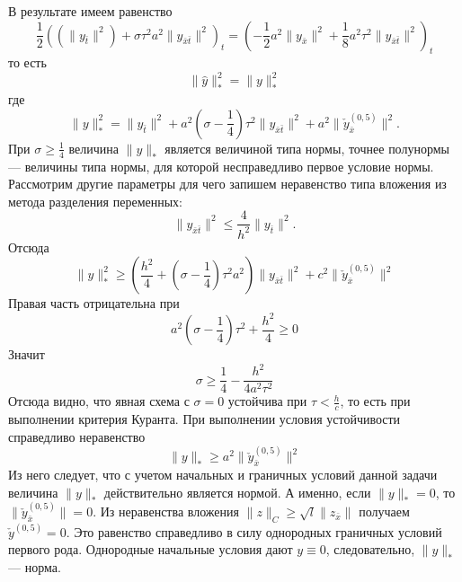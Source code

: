 \documentclass[12pt, a4paper]{article}
\newcommand{\widecheck}[1]{\check{#1}}
\newcommand{\down}[1]{\widecheck{#1}}
\begin{document}
	В результате имеем равенство
	\begin{equation*}
		\frac{1}{2}((\parallel y_{\bar{t}} \parallel^2) + \sigma \tau^2 a^2 \parallel y_{\bar{x}\bar{t}} \parallel^2)_t = (-\frac{1}{2} a^2 \parallel y_{\bar{x}} \parallel^2 + \frac{1}{8} a^2 \tau^2 \parallel y_{\bar{x}\bar{t}} \parallel^2)_t 
	\end{equation*}
	то есть
	\begin{equation*}
		\parallel \hat{y} \parallel^2_* = 	\parallel y \parallel^2_*
	\end{equation*}
	где 
	\begin{equation*}
		\parallel y \parallel^2_* = \parallel y_{\bar{t}} \parallel^2 + a^2(\sigma - \frac{1}{4}) \tau^2  \parallel y_{\bar{x}\bar{t}} \parallel^2 + a^2 \parallel \down{y}^{(0,5)}_{\bar{x}}\parallel^2.
	\end{equation*}
	При $\sigma\ge \frac{1}{4}$ величина $\parallel y \parallel_*$ является величиной типа нормы, точнее полунормы --- величины типа нормы, для которой несправедливо первое условие нормы. Рассмотрим другие параметры для чего запишем неравенство типа вложения из метода разделения переменных:
	\begin{equation*}
		\parallel y_{\bar{x}\bar{t}} \parallel^2 \le \frac{4}{h^2} \parallel y_{\bar{t}} \parallel^2.
	\end{equation*}
	Отсюда
	\begin{equation*}
		\parallel y \parallel^2_* \ge (\frac{h^2}{4} + (\sigma - \frac{1}{4}) \tau^2 a^2) \parallel y_{\bar{x}\bar{t}} \parallel^2 + c^2 \parallel \down{y}^{(0,5)}_{\bar{x}}\parallel^2
	\end{equation*}
	Правая часть отрицательна при
	\begin{equation*}
		a^2(\sigma - \frac{1}{4}) \tau^2 + \frac{h^2}{4} \ge 0
	\end{equation*}
	Значит
	\begin{equation*}
		\sigma \ge \frac{1}{4} - \frac{h^2}{4a^2 \tau^2}
	\end{equation*}
	Отсюда видно, что явная схема с $\sigma = 0$ устойчива при $\tau < \frac{h}{c}$, то есть при выполнении критерия Куранта. 
	При выполнении условия устойчивости справедливо неравенство
	\begin{equation*}
		\parallel y \parallel_* \ge a^2 \parallel \down{y}^{(0,5)}_{\bar{x}}\parallel^2
	\end{equation*}
	Из него следует, что с учетом начальных и граничных условий данной задачи величина $\parallel y \parallel_*$ действительно является нормой.  А именно, если $\parallel y \parallel_* = 0$, то $\parallel \down{y}^{(0,5)}_{\bar{x}}\parallel = 0$. Из неравенства вложения $\parallel z \parallel_C \ge \sqrt{l} \parallel z_{\bar{x}} \parallel$ получаем $\down{y}^{(0,5)} = 0$. Это равенство справедливо в силу однородных граничных условий первого рода. Однородные начальные условия дают $y \equiv 0$, следовательно,  $\parallel y \parallel_*$ --- норма.
	
\end{document}
